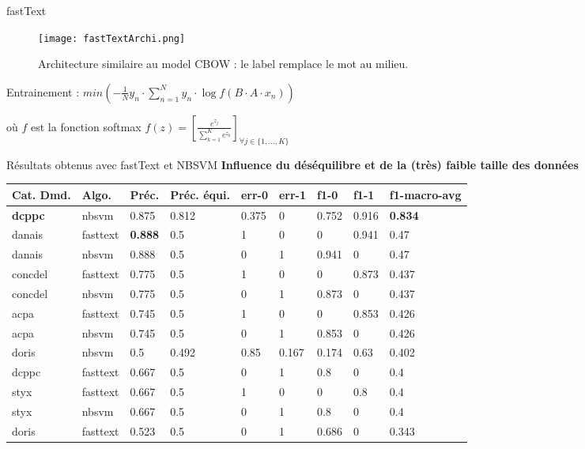 \begin{frame}{fastText \cite{grave2017fasttextcls}}
\begin{figure}
\texttt{[image: fastTextArchi.png]}
\caption{\scriptsize Architecture similaire au model CBOW : le label remplace le mot au milieu.}
\end{figure}

Entrainement : $min \left(-\frac{1}{N}y_n \cdot \sum\limits_{n=1}^N y_n \cdot \log{f(B\cdot A\cdot x_n)}\right)$ 

où $f$ est la fonction softmax $f(z) = \left[ \frac{e^{z_j}}{\sum\limits_{k=1}^K e^{z_k}} \right]_{\forall j \in \lbrace 1, ..., K \rbrace} $
\end{frame}

\begin{frame}{Résultats obtenus avec fastText et NBSVM}
\textbf{Influence du déséquilibre et de la (très) faible taille des données}
\begin{table}
\scriptsize
\begin{tabular}{|l|l|l|l|l|l|l|l|l|}
\hline
\textbf{Cat. Dmd.} & \textbf{Algo.} & \textbf{Préc.}   & \textbf{Préc. équi.} & \textbf{err-0} & \textbf{err-1} & \textbf{f1-0}  & \textbf{f1-1}  & \textbf{f1-macro-avg} \\ \hline
\textbf{dcppc}       & nbsvm      & 0.875 & 0.812        & 0.375 & 0     & 0.752 & 0.916 & \textbf{0.834}        \\ \hline
danais      & fasttext   & \textbf{0.888} & 0.5          & 1     & 0     & 0     & 0.941 & 0.47         \\ \hline
danais      & nbsvm      & 0.888 & 0.5          & 0     & 1     & 0.941 & 0     & 0.47         \\ \hline
concdel     & fasttext   & 0.775 & 0.5          & 1     & 0     & 0     & 0.873 & 0.437        \\ \hline
concdel     & nbsvm      & 0.775 & 0.5          & 0     & 1     & 0.873 & 0     & 0.437        \\ \hline
acpa        & fasttext   & 0.745 & 0.5          & 1     & 0     & 0     & 0.853 & 0.426        \\ \hline
acpa        & nbsvm      & 0.745 & 0.5          & 0     & 1     & 0.853 & 0     & 0.426        \\ \hline
doris       & nbsvm      & 0.5   & 0.492        & 0.85  & 0.167 & 0.174 & 0.63  & 0.402        \\ \hline
dcppc       & fasttext   & 0.667 & 0.5          & 0     & 1     & 0.8   & 0     & 0.4          \\ \hline
styx        & fasttext   & 0.667 & 0.5          & 1     & 0     & 0     & 0.8   & 0.4          \\ \hline
styx        & nbsvm      & 0.667 & 0.5          & 0     & 1     & 0.8   & 0     & 0.4          \\ \hline
doris       & fasttext   & 0.523 & 0.5          & 0     & 1     & 0.686 & 0     & 0.343        \\ \hline
\end{tabular}


\end{table}
\end{frame}
